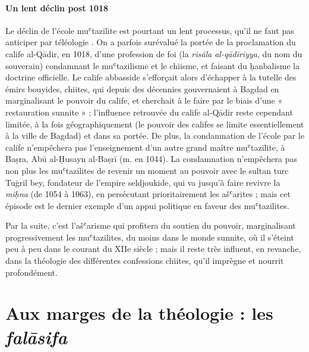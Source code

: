 \paragraph{Un lent déclin post 1018} Le déclin de l'école muʿtazilite est pourtant un lent processus, qu'il
ne faut pas anticiper par téléologie . On a parfois surévalué la portée
de la proclamation du calife al-Qādir, en 1018, d'une profession de foi
(la \emph{risāla al-qādiriyya}, du nom du souverain) condamnant le
muʿtazilisme et le chiisme, et faisant du ḥanbalisme la doctrine
officielle. Le calife abbasside s'efforçait alors d'échapper à la
tutelle des émirs bouyides, chiites, qui depuis des décennies
gouvernaient à Bagdad en marginalisant le pouvoir du calife, et
cherchait à le faire par le biais d'une « restauration sunnite » ;
l'influence retrouvée du calife al-Qādir reste cependant limitée, à la
fois géographiquement (le pouvoir des califes se limite essentiellement
à la ville de Bagdad) et dans sa portée. De plus, la condamnation de
l'école par le calife n'empêchera pas l'enseignement d'un autre grand
maître muʿtazilite, à Baṣra, Abū al-Ḥusayn al-Baṣrī (m. en 1044). La
condamnation n'empêchera pas non plus les muʿtazilites de revenir un
moment au pouvoir avec le sultan turc Tuġril bey, fondateur de l'empire
seldjoukide, qui va jusqu'à
faire revivre la \emph{miḥna} (de 1054 à 1063), en persécutant
prioritairement les ašʿarites ; mais cet
épisode est le dernier exemple d'un appui politique en faveur des
muʿtazilites.

Par la suite, c'est l'ašʿarisme qui profitera du soutien du pouvoir,
marginalisant progressivement les muʿtazilites, du moins dans le monde
sunnite, où il s'éteint peu à peu dans le courant du XIIe siècle ; mais
il reste très influent, en revanche, dans la théologie des différentes
confessions chiites, qu'il imprègne et nourrit profondément.


\hypertarget{aux-marges-de-la-thuxe9ologie-les-falux101sifa}{%
\section{\texorpdfstring{Aux marges de la théologie : les
\emph{falāsifa}}{Aux marges de la théologie : les falāsifa}}\label{aux-marges-de-la-thuxe9ologie-les-falux101sifa}}


